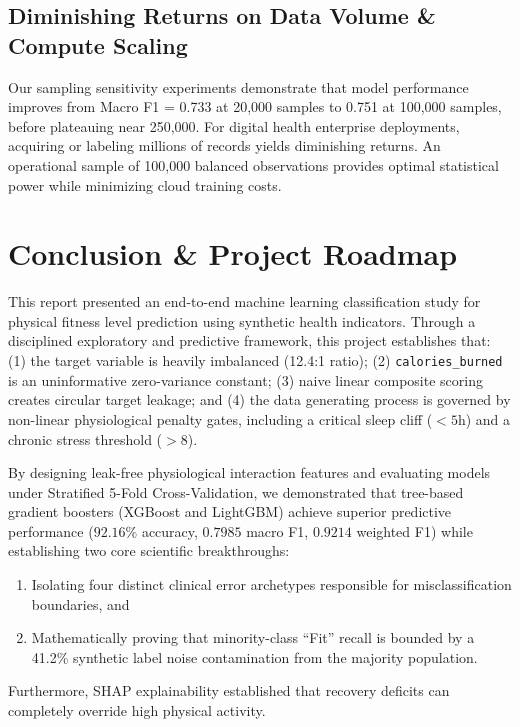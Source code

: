 \documentclass[11pt,a4paper]{article}
\begin{document}
\subsection{Diminishing Returns on Data Volume \& Compute Scaling}
Our sampling sensitivity experiments demonstrate that model performance improves from Macro F1 = 0.733 at 20,000 samples to 0.751 at 100,000 samples, before plateauing near 250,000. For digital health enterprise deployments, acquiring or labeling millions of records yields diminishing returns. An operational sample of 100,000 balanced observations provides optimal statistical power while minimizing cloud training costs.

\section{Conclusion \& Project Roadmap}
This report presented an end-to-end machine learning classification study for physical fitness level prediction using synthetic health indicators. Through a disciplined exploratory and predictive framework, this project establishes that: (1) the target variable is heavily imbalanced (12.4:1 ratio); (2) \texttt{calories\_burned} is an uninformative zero-variance constant; (3) naive linear composite scoring creates circular target leakage; and (4) the data generating process is governed by non-linear physiological penalty gates, including a critical sleep cliff ($<5$h) and a chronic stress threshold ($>8$).

By designing leak-free physiological interaction features and evaluating models under Stratified 5-Fold Cross-Validation, we demonstrated that tree-based gradient boosters (XGBoost and LightGBM) achieve superior predictive performance ($\mathbf{92.16\%}$ accuracy, $\mathbf{0.7985}$ macro F1, $\mathbf{0.9214}$ weighted F1) while establishing two core scientific breakthroughs:
\begin{enumerate}[leftmargin=*,itemsep=1pt]
    \item Isolating four distinct clinical error archetypes responsible for misclassification boundaries, and
    \item Mathematically proving that minority-class ``Fit'' recall is bounded by a 41.2\% synthetic label noise contamination from the majority population.
\end{enumerate}
Furthermore, SHAP explainability established that recovery deficits can completely override high physical activity.
\end{document}

